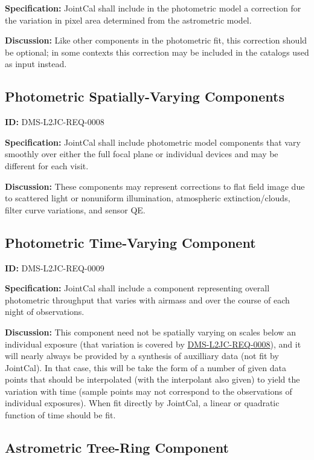 \documentclass[SE,toc,lsstdraft]{lsstdoc}
\begin{document}
\textbf{Specification:}
JointCal shall include in the photometric model a correction for the variation in pixel area determined from the astrometric model.

\textbf{Discussion:}
Like other components in the photometric fit, this correction should be optional; in some contexts this correction may be included in the catalogs used as input instead.

\subsection{Photometric Spatially-Varying Components}

\label{DMS-L2JC-REQ-0008}
\textbf{ID:} DMS-L2JC-REQ-0008

\textbf{Specification:}
JointCal shall include photometric model components that vary smoothly over either the full focal plane or individual devices and may be different for each visit.

\textbf{Discussion:}
These components may represent corrections to flat field image due to scattered light or nonuniform illumination, atmospheric extinction/clouds, filter curve variations, and sensor QE.

\subsection{Photometric Time-Varying Component}

\label{DMS-L2JC-REQ-0009}
\textbf{ID:} DMS-L2JC-REQ-0009

\textbf{Specification:}
JointCal shall include a component representing overall photometric throughput that varies with airmass and over the course of each night of observations.

\textbf{Discussion:}
This component need not be spatially varying on scales below an individual exposure (that variation is covered by \hyperref[DMS-L2JC-REQ-0008]{DMS-L2JC-REQ-0008}), and it will nearly always be provided by a synthesis of auxilliary data (not fit by JointCal).  In that case, this will be take the form of a number of given data points that should be interpolated (with the interpolant also given) to yield the variation with time (sample points may not correspond to the observations of individual exposures).  When fit directly by JointCal, a linear or quadratic function of time should be fit.

\subsection{Astrometric Tree-Ring Component}
\end{document}
